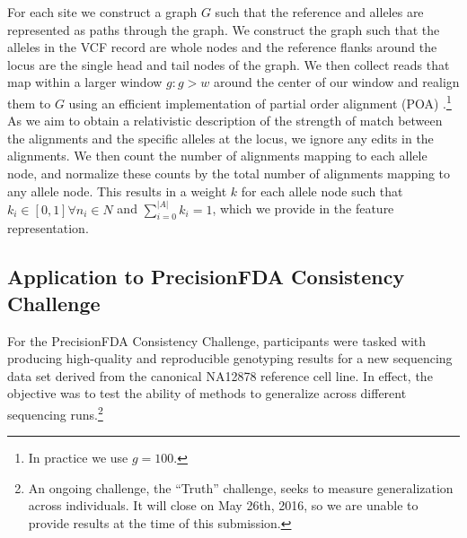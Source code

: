 \documentclass{article}
\begin{document}
For each site we construct a graph $G$ such that the reference and alleles are represented as paths through the graph.
We construct the graph such that the alleles in the VCF record are whole nodes and the reference flanks around the locus are the single head and tail nodes of the graph.
We then collect reads that map within a larger window $g : g > w$ around the center of our window and realign them to $G$ using an efficient implementation of partial order alignment (POA) \cite{lee2002POA}.\footnote{In practice we use $g = 100$.}
As we aim to obtain a relativistic description of the strength of match between the alignments and the specific alleles at the locus, we ignore any edits in the alignments.
We then count the number of alignments mapping to each allele node, and normalize these counts by the total number of alignments mapping to any allele node.
This results in a weight $k$ for each allele node such that $k_i \in [0, 1] \forall n_i \in N$ and $\sum_{i = 0}^{|A|} k_i = 1$, which we provide in the feature representation.

\subsection{Application to PrecisionFDA Consistency Challenge}

For the PrecisionFDA Consistency Challenge, participants were tasked with producing high-quality and reproducible genotyping results for a new sequencing data set derived from the canonical NA12878 reference cell line.
In effect, the objective was to test the ability of methods to generalize across different sequencing runs.\footnote{An ongoing challenge, the ``Truth'' challenge, seeks to measure generalization across individuals. It will close on May 26th, 2016, so we are unable to provide results at the time of this submission.}
\end{document}
